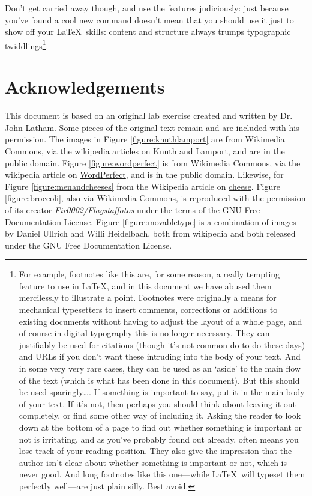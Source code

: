 Don't get carried away though, and use the features judiciously: just because you've found a cool new command doesn't mean that you should use it just to show off your \LaTeX\ skills: content and structure always trumps typographic twiddlings\footnote{For example, footnotes like this are, for some reason, a really tempting feature to use in \LaTeX, and in this document we have abused them mercilessly to illustrate a point. Footnotes were originally a means for mechanical typesetters to insert comments, corrections or additions to existing documents without having to adjust the layout of a whole page, and of course in digital typography this is no longer necessary. They can justifiably be used for citations (though it's not common do to do these days) and URLs if you don't want these intruding into the body of your text. And in some very very rare cases, they can be used as an `aside' to the main flow of the text (which is what has been done in this document). But this should be used sparingly\ldots. If something is important to say, put it in the main body of your text. If it's not, then perhaps you should think about leaving it out completely, or find some other way of including it. Asking the reader to look down at the bottom of a page to find out whether something is important or not is irritating, and as you've probably found out already, often means you lose track of your reading position. They also give the impression that the author isn't clear about whether something is important or not, which is never good. And long footnotes like this one---while \LaTeX\ will typeset them perfectly well---are just plain silly. Best avoid.}.

\section{Acknowledgements}

This document is based on an original lab exercise created and written by Dr. John Latham. Some pieces of the original text remain and are included with his permission.  The images in Figure \ref{figure:knuthlamport} are from Wikimedia Commons, via the wikipedia articles on Knuth and Lamport, and are in the public domain. Figure \ref{figure:wordperfect} is from Wikimedia Commons, via the wikipedia article on \href{http://en.wikipedia.org/wiki/WordPerfect}{WordPerfect}, and is in the public domain. Likewise, for Figure \ref{figure:menandcheeses} from the Wikipedia article on \href{http://en.wikipedia.org/wiki/Cheese}{cheese}. Figure \ref{figure:broccoli}, also via Wikimedia Commons, is reproduced with the permission of its creator \href{http://commons.wikimedia.org/wiki/User:Fir0002}{\emph{Fir0002/Flagstaffotos}} under the terms of the \href{http://commons.wikimedia.org/wiki/Commons:GNU_Free_Documentation_License_1.2}{GNU Free Documentation License}. Figure \ref{figure:movabletype} is a combination of images by Daniel Ullrich and Willi Heidelbach, both from wikipedia and both released under the GNU Free Documentation License.
\endinput

